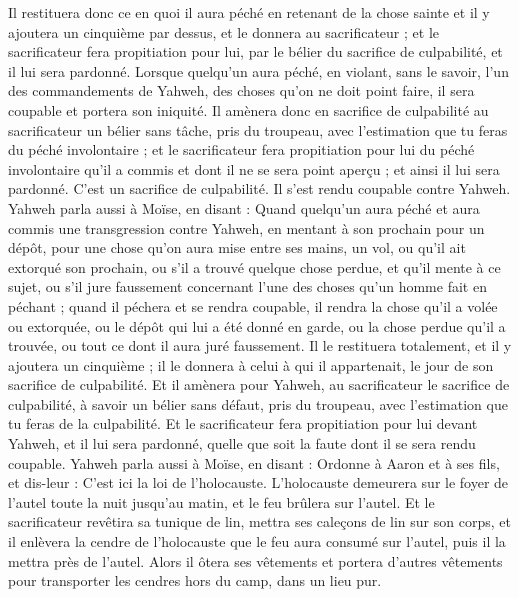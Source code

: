 \begin{multicols}{2}
Il restituera donc ce en quoi il aura péché en retenant de la chose sainte et il y ajoutera un cinquième par dessus, et le donnera au sacrificateur ; et le sacrificateur fera propitiation pour lui, par le bélier du sacrifice de culpabilité, et il lui sera pardonné.
Lorsque quelqu'un aura péché, en violant, sans le savoir, l'un des commandements de Yahweh, des choses qu'on ne doit point faire, il sera coupable et portera son iniquité.
 Il amènera donc en sacrifice de culpabilité au sacrificateur un bélier sans tâche, pris du troupeau, avec l'estimation que tu feras du péché involontaire ; et le sacrificateur fera propitiation pour lui du péché involontaire qu'il a commis et dont il ne se sera point aperçu ; et ainsi il lui sera pardonné.
C'est un sacrifice de culpabilité. Il s'est rendu coupable contre Yahweh.
Yahweh parla aussi à Moïse, en disant :
Quand quelqu'un aura péché et aura commis une transgression contre Yahweh, en mentant à son prochain pour un dépôt, pour une chose qu'on aura mise entre ses mains, un vol, ou qu'il ait extorqué son prochain,
ou s'il a trouvé quelque chose perdue, et qu'il mente à ce sujet, ou s'il jure faussement concernant l'une des choses qu'un homme fait en péchant ;
quand il péchera et se rendra coupable, il rendra la chose qu'il a volée ou extorquée, ou le dépôt qui lui a été donné en garde, ou la chose perdue qu'il a trouvée,
ou tout ce dont il aura juré faussement. Il le restituera totalement, et il y ajoutera un cinquième ; il le donnera à celui à qui il appartenait, le jour de son sacrifice de culpabilité.
Et il amènera pour Yahweh, au sacrificateur le sacrifice de culpabilité, à savoir un bélier sans défaut, pris du troupeau, avec l'estimation que tu feras de la culpabilité.
Et le sacrificateur fera propitiation pour lui devant Yahweh, et il lui sera pardonné, quelle que soit la faute dont il se sera rendu coupable. 
\VerseOne{}Yahweh parla aussi à Moïse, en disant :
Ordonne à Aaron et à ses fils, et dis-leur : C'est ici la loi de l'holocauste. L'holocauste demeurera sur le foyer de l'autel toute la nuit jusqu'au matin, et le feu brûlera sur l'autel.
Et le sacrificateur revêtira sa tunique de lin, mettra ses caleçons de lin sur son corps, et il enlèvera la cendre de l'holocauste que le feu aura consumé sur l'autel, puis il la mettra près de l'autel.
Alors il ôtera ses vêtements et portera d'autres vêtements pour transporter les cendres hors du camp, dans un lieu pur.

\end{multicols}
